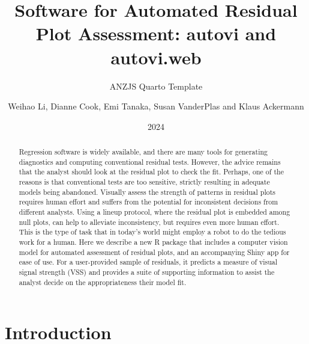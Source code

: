 \documentclass[
doublespace,
  times]{anzsauth}
\title{Software for Automated Residual Plot Assessment: autovi and
autovi.web}
\subtitle{ANZJS Quarto Template}
\author{
Weihao Li\addressnum{1},
Dianne Cook\addressnum{1},
Emi Tanaka\addressnum{2},
Susan VanderPlas\addressnum{3} and
Klaus Ackermann
\addressnum{1}
}
\affiliation{
Monash University,
The Australian National University and
University of Nebraska
}
\date{2024}
\begin{document}
\begin{abstract}
Regression software is widely available, and there are many tools for
generating diagnostics and computing conventional residual tests.
However, the advice remains that the analyst should look at the residual
plot to check the fit. Perhaps, one of the reasons is that conventional
tests are too sensitive, strictly resulting in adequate models being
abandoned. Visually assess the strength of patterns in residual plots
requires human effort and suffers from the potential for inconsistent
decisions from different analysts. Using a lineup protocol, where the
residual plot is embedded among null plots, can help to alleviate
inconsistency, but requires even more human effort. This is the type of
task that in today's world might employ a robot to do the tedious work
for a human. Here we describe a new R package that includes a computer
vision model for automated assessment of residual plots, and an
accompanying Shiny app for ease of use. For a user-provided sample of
residuals, it predicts a measure of visual signal strength (VSS) and
provides a suite of supporting information to assist the analyst decide
on the appropriateness their model fit.
\end{abstract}

          

\maketitle


\section{Introduction}\label{sec-autovi-introduction}
\end{document}
